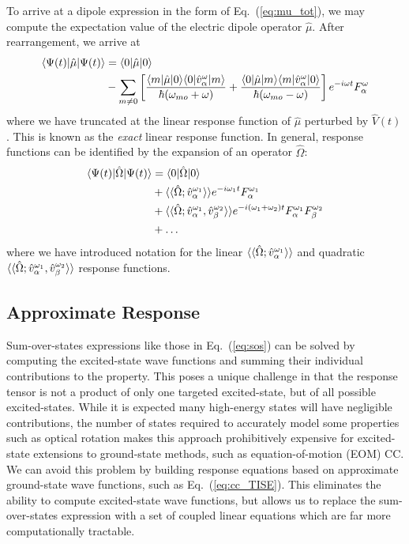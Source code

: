 {{To arrive at a dipole expression in the form of Eq.~(\ref{eq:mu_tot}), we may compute the expectation 
value of the electric dipole operator $\hat{\mu}$. After rearrangement, we arrive at
\begin{equation} \label{eq:sos}
    \begin{aligned}
    \langle\Psi(t) |\hat\mu| \Psi(t) \rangle &= \langle0 |\hat\mu| 0 \rangle \\ 
    &- \sum_{m\neq0}\left[\frac{\langle m |\hat\mu| 0 \rangle\langle0 |\hat{v}^\omega_\alpha| m \rangle}{\hbar(\omega_{mo}+\omega)}
        + \frac{\langle0 |\hat\mu| m \rangle\langle m |\hat{v}^\omega_\alpha| 0 \rangle}{\hbar(\omega_{mo}-\omega)}\right]
    e^{-i\omega t}F^\omega_\alpha
    \end{aligned}
\end{equation}
where we have truncated at the linear response function of $\hat{\mu}$ perturbed by $\hat{V}(t)$. This is known as the \textit{exact} linear response function. In general, 
response functions can be identified by the expansion of an operator $\hat\Omega$:
\begin{equation}
    \begin{aligned}
    \langle\Psi(t) |\hat\Omega| \Psi(t) \rangle &= \langle0 |\hat\Omega| 0 \rangle \\ 
    &+ \langle\langle\hat\Omega;\hat{v}^{\omega_1}_\alpha\rangle\rangle e^{-i\omega_1 t}F^{\omega_1}_\alpha \\ 
    &+ \langle\langle\hat\Omega;\hat{v}^{\omega_1}_\alpha,\hat{v}^{\omega_2}_\beta\rangle\rangle e^{-i(\omega_1+\omega_2)t}F^{\omega_1}_\alpha F^{\omega_2}_\beta \\
    &+ \ldots
    \end{aligned}
\end{equation}
where we have introduced notation for the linear $\langle\langle\hat\Omega;\hat{v}^{\omega_1}_\alpha\rangle\rangle$ 
and quadratic $\langle\langle\hat\Omega;\hat{v}^{\omega_1}_\alpha,\hat{v}^{\omega_2}_\beta\rangle\rangle$ response functions.

\subsection{Approximate Response} \label{ss:apprx} Sum-over-states expressions
like those in Eq.~(\ref{eq:sos}) can be solved by computing the excited-state
wave functions and summing their individual contributions to the property. This
poses a unique challenge in that the response tensor is not a product of only
one targeted excited-state, but of all possible excited-states. While it is
expected many high-energy states will have negligible contributions, the number
of states required to accurately model some properties such as optical rotation
makes this approach prohibitively expensive for excited-state extensions to
ground-state methods, such as equation-of-motion (EOM) CC.\cite{Wiberg2006}  
We can avoid this
problem by building response equations based on approximate ground-state wave
functions, such as Eq.~(\ref{eq:cc_TISE}). This eliminates the ability to
compute excited-state wave functions, but allows us to replace the
sum-over-states expression with a set of coupled linear equations which are far
more computationally tractable.\cite{Norman2011,Helgaker2012}

}}

